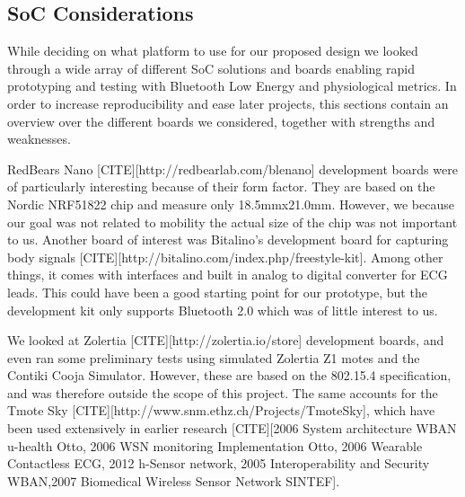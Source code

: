 
\subsection{SoC Considerations} %
\label{sub:soc_considerations}

While deciding on what platform to use for our proposed design we looked through a wide array of different SoC solutions and boards enabling rapid prototyping and testing with Bluetooth Low Energy and physiological metrics. In order to increase reproducibility and ease later projects, this sections contain an overview over the different boards we considered, together with strengths and weaknesses.

RedBears Nano [CITE][http://redbearlab.com/blenano] development boards were of particularly interesting because of their form factor. They are based on the Nordic NRF51822 chip and measure only 18.5mmx21.0mm. However, we because our goal was not related to mobility the actual size of the chip was not important to us. Another board of interest was Bitalino's development board for capturing body signals [CITE][http://bitalino.com/index.php/freestyle-kit]. Among other things, it comes with interfaces and built in analog to digital converter for ECG leads. This could have been a good starting point for our prototype, but the development kit only supports Bluetooth 2.0 which was of little interest to us.

We looked at Zolertia [CITE][http://zolertia.io/store] development boards, and even ran some preliminary tests using simulated Zolertia Z1 motes and the Contiki Cooja Simulator. However, these are based on the 802.15.4 specification, and was therefore outside the scope of this project. The same accounts for the Tmote Sky [CITE][http://www.snm.ethz.ch/Projects/TmoteSky], which have been used extensively in earlier research [CITE][2006 System architecture WBAN u-health Otto, 2006 WSN monitoring Implementation Otto, 2006 Wearable Contactless ECG, 2012 h-Sensor network, 2005 Interoperability and Security WBAN,2007 Biomedical Wireless Sensor Network SINTEF].

